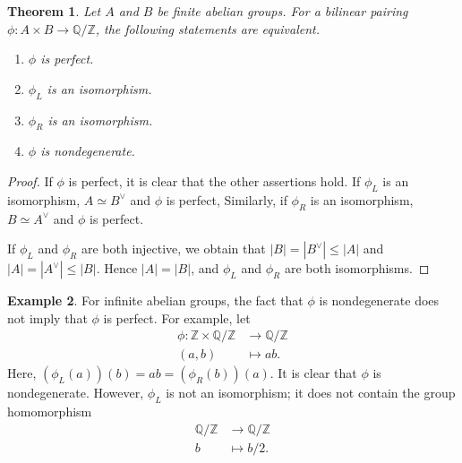 \documentclass[12pt]{report}
\theoremstyle{plain}
\newtheorem{theorem}{Theorem}[section]
\theoremstyle{remark}
\theoremstyle{definition}
\newtheorem{example}[theorem]{Example}
\newcommand{\Z}{\mathbb{Z}}
\newcommand{\Q}{\mathbb{Q}}
\begin{document}
\begin{theorem}
    Let $A$ and $B$ be finite abelian groups. For a bilinear pairing $\phi:A\times B\rightarrow \Q/\Z$, the following statements are equivalent.
    \begin{enumerate}
        \item $\phi$ is perfect.
        \item $\phi_L$ is an isomorphism.
        \item $\phi_R$ is an isomorphism.
        \item $\phi$ is nondegenerate.
    \end{enumerate}
\end{theorem}
\begin{proof}
    If $\phi$ is perfect, it is clear that the other assertions hold. If $\phi_L$ is an isomorphism, $A\simeq B^\vee$ and $\phi$ is perfect, Similarly, if $\phi_R$ is an isomorphism, $B\simeq A^\vee$ and $\phi$ is perfect.

    If $\phi_L$ and $\phi_R$ are both injective, we obtain that $|B|=|B^\vee|\le |A|$ and $|A|=|A^\vee|\le |B|$. Hence $|A|=|B|$, and $\phi_L$ and $\phi_R$ are both isomorphisms.
\end{proof}

\begin{example}
    For infinite abelian groups, the fact that $\phi$ is nondegenerate does not imply that $\phi$ is perfect. For example, let
    \begin{align*}
        \phi:\Z\times \Q/\Z &\rightarrow \Q/\Z \\
        (a,b) &\mapsto ab.
    \end{align*}
    Here, $(\phi_L(a))(b) = ab = (\phi_R(b))(a)$. It is clear that $\phi$ is nondegenerate. However, $\phi_L$ is not an isomorphism; it does not contain the group homomorphism
    \begin{align*}
        \Q/\Z &\rightarrow \Q/\Z \\
        b &\mapsto b/2.
    \end{align*}
\end{example}
\end{document}
